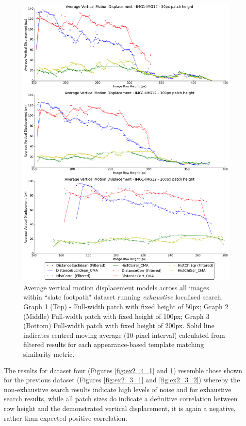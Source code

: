 \clearpage
\begin{figure}[ht!]
\centering
\includegraphics[scale=0.3]{images/results/path_outside_10cm_non_scaled_exhaustive}
\caption{Average vertical motion displacement models across all images within ``slate footpath" dataset running \textit{exhaustive} localised search. Graph 1 (Top) - Full-width patch with fixed height of 50px; Graph 2 (Middle) Full-width patch with fixed height of 100px; Graph 3 (Bottom) Full-width patch with fixed height of 200px. Solid line indicates centred moving average (10-pixel interval) calculated from filtered results for each appearance-based template matching similarity metric.}
\label{fig:ex2_4_2}
\end{figure}


The results for dataset four (Figures \ref{fig:ex2_4_1} and \ref{fig:ex2_4_2}) resemble those shown for the previous dataset (Figures \ref{fig:ex2_3_1} and \ref{fig:ex2_3_2}) whereby the non-exhaustive search results indicate high levels of noise and for exhaustive search results, while all patch sizes do indicate a definitive correlation between row height and the demonstrated vertical displacement, it is again a negative, rather than expected positive correlation. 

